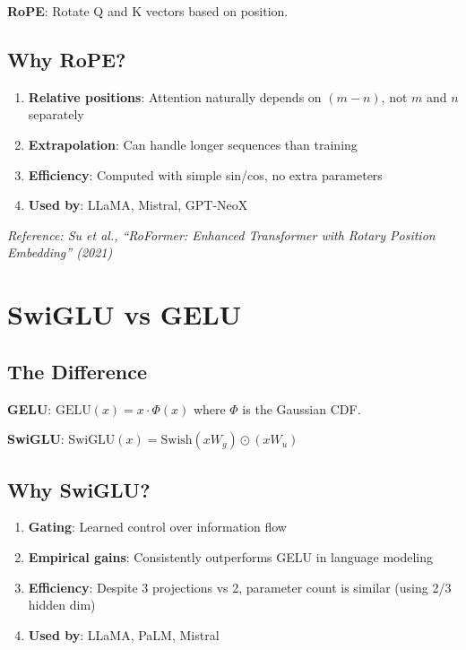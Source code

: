 \textbf{RoPE}: Rotate Q and K vectors based on position.

\subsection{Why RoPE?}

\begin{enumerate}
    \item \textbf{Relative positions}: Attention naturally depends on $(m - n)$, not $m$ and $n$ separately
    \item \textbf{Extrapolation}: Can handle longer sequences than training
    \item \textbf{Efficiency}: Computed with simple sin/cos, no extra parameters
    \item \textbf{Used by}: LLaMA, Mistral, GPT-NeoX
\end{enumerate}

\textit{Reference: Su et al., ``RoFormer: Enhanced Transformer with Rotary Position Embedding'' (2021)}

\section{SwiGLU vs GELU}

\subsection{The Difference}

\textbf{GELU}: $\text{GELU}(x) = x \cdot \Phi(x)$ where $\Phi$ is the Gaussian CDF.

\textbf{SwiGLU}: $\text{SwiGLU}(x) = \text{Swish}(xW_g) \odot (xW_u)$

\subsection{Why SwiGLU?}

\begin{enumerate}
    \item \textbf{Gating}: Learned control over information flow
    \item \textbf{Empirical gains}: Consistently outperforms GELU in language modeling
    \item \textbf{Efficiency}: Despite 3 projections vs 2, parameter count is similar (using 2/3 hidden dim)
    \item \textbf{Used by}: LLaMA, PaLM, Mistral
\end{enumerate}

